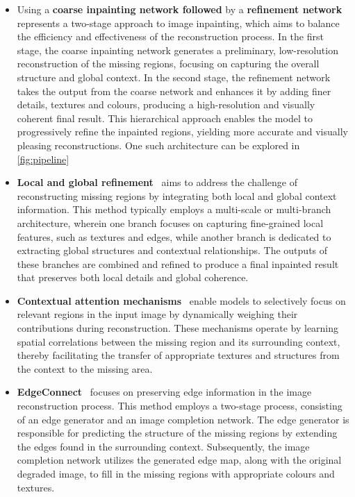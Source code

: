 \begin{itemize}[leftmargin=1.5em]
    \item Using a \textbf{coarse inpainting network followed} by a \textbf{refinement network}~\supercite{free-form-inpainting, local-and-global, context-inpainting} represents a two-stage approach to image inpainting, which aims to balance the efficiency and effectiveness of the reconstruction process. In the first stage, the coarse inpainting network generates a preliminary, low-resolution reconstruction of the missing regions, focusing on capturing the overall structure and global context. In the second stage, the refinement network takes the output from the coarse network and enhances it by adding finer details, textures and colours, producing a high-resolution and visually coherent final result. This hierarchical approach enables the model to progressively refine the inpainted regions, yielding more accurate and visually pleasing reconstructions. One such architecture can be explored in \autoref{fig:pipeline}

    \item \textbf{Local and global refinement}~\supercite{local-and-global} aims to address the challenge of reconstructing missing regions by integrating both local and global context information. This method typically employs a multi-scale or multi-branch architecture, wherein one branch focuses on capturing fine-grained local features, such as textures and edges, while another branch is dedicated to extracting global structures and contextual relationships. The outputs of these branches are combined and refined to produce a final inpainted result that preserves both local details and global coherence.

    \item \textbf{Contextual attention mechanisms}~\supercite{context-inpainting,enhanced-normalization} enable models to selectively focus on relevant regions in the input image by dynamically weighing their contributions during reconstruction. These mechanisms operate by learning spatial correlations between the missing region and its surrounding context, thereby facilitating the transfer of appropriate textures and structures from the context to the missing area.

    \item \textbf{EdgeConnect}~\supercite{edgeconnect} focuses on preserving edge information in the image reconstruction process. This method employs a two-stage process, consisting of an edge generator and an image completion network. The edge generator is responsible for predicting the structure of the missing regions by extending the edges found in the surrounding context. Subsequently, the image completion network utilizes the generated edge map, along with the original degraded image, to fill in the missing regions with appropriate colours and textures.
\end{itemize}
\vspace{0.5em}

